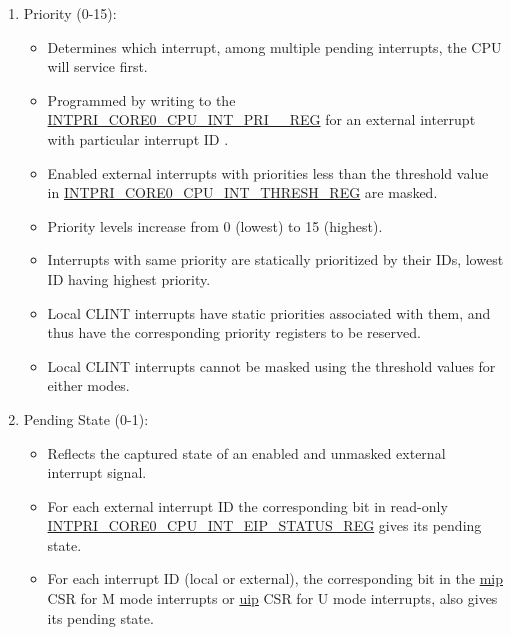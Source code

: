 \documentclass[main\_\_EN.tex]{subfiles}
\begin{document}
\begin{enumerate}
\begin{itemize}
        \item An interrupt for which type is kept 0 is referred as a 'level' type interrupt.
        \item An interrupt for which type is set to 1 is referred as an 'edge' type interrupt.
        \item Local CLINT interrupts are always 'level' type and thus have the corresponding bits reserved in the above register.
    \end{itemize}
    \item Priority (0-15):
    \begin{itemize}
        \item Determines which interrupt, among multiple pending interrupts, the CPU will service first.
        \item Programmed by writing to the \hyperref[regdesc:INTPRICORE0CPUINTPRINREG]{INTPRI\_CORE0\_CPU\_INT\_PRI\_\_REG} for an external interrupt with particular interrupt ID .
        \item Enabled external interrupts with priorities less than the threshold value in \hyperref[regdesc:INTPRICORE0CPUINTTHRESHREG]{INTPRI\_CORE0\_CPU\_INT\_THRESH\_REG} are masked.
        \item Priority levels increase from 0 (lowest) to 15 (highest).
        \item Interrupts with same priority are statically prioritized by their IDs, lowest ID having highest priority.
        \item Local CLINT interrupts have static priorities associated with them, and thus have the corresponding priority registers to be reserved.
        \item Local CLINT interrupts cannot be masked using the threshold values for either modes.
    \end{itemize}
    \item Pending State (0-1):
    \begin{itemize}
        \item Reflects the captured state of an enabled and unmasked external interrupt signal.
        \item For each external interrupt ID the corresponding bit in read-only \hyperref[regdesc:INTPRICORE0CPUINTEIPSTATUSREG]{INTPRI\_CORE0\_CPU\_INT\_EIP\_STATUS\_REG} gives its pending state.
        \item For each interrupt ID (local or external), the corresponding bit in the \hyperref[regdesc:MIP]{mip} CSR for M mode interrupts or \hyperref[regdesc:UIP]{uip} CSR for U mode interrupts, also gives its pending state.

\end{itemize}
\end{enumerate}
\end{document}

